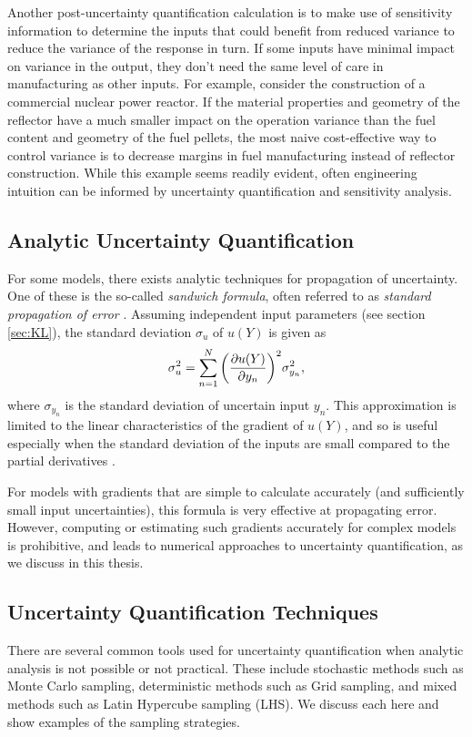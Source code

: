 Another post-uncertainty quantification calculation is to make use of sensitivity information to determine
the inputs that could benefit from reduced variance to reduce the variance of the response in turn.
If some inputs have minimal impact on variance in the output, they don't need the same level of care
in manufacturing as other inputs.  For example, consider the construction of a commercial nuclear power
reactor.  If the material properties and geometry of the reflector have a much smaller impact on the operation
variance than the fuel content and geometry of the fuel pellets, the most naive cost-effective way to control
variance is to decrease margins in fuel manufacturing instead of reflector construction.  While this example
seems readily evident, often engineering intuition can be informed by uncertainty quantification and
sensitivity analysis.

\subsection{Analytic Uncertainty Quantification}
For some models, there exists analytic techniques for propagation of uncertainty.  One of these is the
so-called \emph{sandwich formula}, often referred to as \emph{standard propagation of error} \cite{sandwich}.
Assuming independent input parameters (see section \ref{sec:KL}), the standard deviation $\sigma_u$ of $u(Y)$
is given as
\begin{equation}
  \sigma^2_u = \sum_{n=1}^N \qty(\pdv{u(Y)}{y_n})^2\sigma_{y_n}^2,
\end{equation}
where $\sigma_{y_n}$ is the standard deviation of uncertain input $y_n$.  This approximation is limited to the
linear characteristics of the gradient of $u(Y)$, and so is useful especially when the standard deviation of
the inputs are small compared to the partial derivatives \cite{sandwich2}.

For models with gradients that are simple to calculate accurately (and sufficiently small input
uncertainties), this formula is very effective at propagating error.  However, computing or estimating such
gradients accurately for complex models is prohibitive, and leads to numerical approaches to uncertainty
quantification, as we discuss in this thesis.


\subsection{Uncertainty Quantification Techniques}
There are several common tools used for uncertainty quantification when analytic analysis is not possible or
not practical.
These include stochastic methods such as Monte Carlo sampling, deterministic methods such as Grid sampling,
and mixed methods such as Latin Hypercube sampling (LHS). We discuss each here and show examples of the
sampling strategies.


